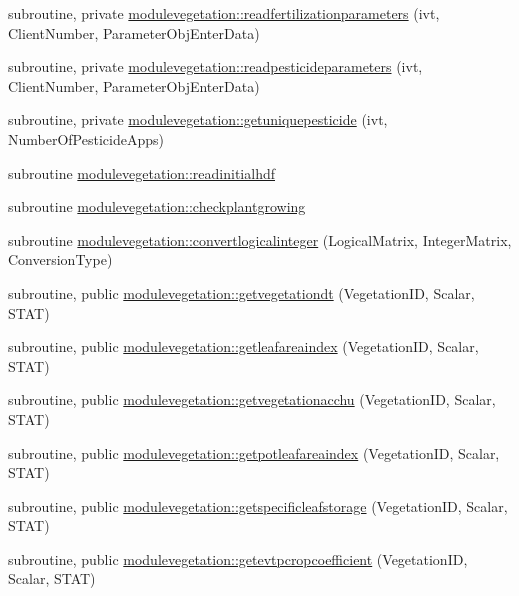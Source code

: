 \begin{DoxyCompactItemize}
subroutine, private \mbox{\hyperlink{namespacemodulevegetation_a5f1703a3712f12ee155098c63f043191}{modulevegetation\+::readfertilizationparameters}} (ivt, Client\+Number, Parameter\+Obj\+Enter\+Data)
\item 
subroutine, private \mbox{\hyperlink{namespacemodulevegetation_abfd09d09ab90a3303dcc3a496d57223a}{modulevegetation\+::readpesticideparameters}} (ivt, Client\+Number, Parameter\+Obj\+Enter\+Data)
\item 
subroutine, private \mbox{\hyperlink{namespacemodulevegetation_a57f3018a613928cdd40f99577993f439}{modulevegetation\+::getuniquepesticide}} (ivt, Number\+Of\+Pesticide\+Apps)
\item 
subroutine \mbox{\hyperlink{namespacemodulevegetation_ae02d565fa46c0234360e5a9da0983414}{modulevegetation\+::readinitialhdf}}
\item 
subroutine \mbox{\hyperlink{namespacemodulevegetation_a2d8935c5541507a64b862765b5c7702c}{modulevegetation\+::checkplantgrowing}}
\item 
subroutine \mbox{\hyperlink{namespacemodulevegetation_af795c019d50bbacd6767423599de5ea5}{modulevegetation\+::convertlogicalinteger}} (Logical\+Matrix, Integer\+Matrix, Conversion\+Type)
\item 
subroutine, public \mbox{\hyperlink{namespacemodulevegetation_a357b84bec55907c71de65f8c878020f2}{modulevegetation\+::getvegetationdt}} (Vegetation\+ID, Scalar, S\+T\+AT)
\item 
subroutine, public \mbox{\hyperlink{namespacemodulevegetation_acf7940a010ec79861c9eaee61e66b333}{modulevegetation\+::getleafareaindex}} (Vegetation\+ID, Scalar, S\+T\+AT)
\item 
subroutine, public \mbox{\hyperlink{namespacemodulevegetation_a9c5cba62246c38a0de1aebb1aaa788d6}{modulevegetation\+::getvegetationacchu}} (Vegetation\+ID, Scalar, S\+T\+AT)
\item 
subroutine, public \mbox{\hyperlink{namespacemodulevegetation_a135c6aa1fdf9824ab93f467c026a344f}{modulevegetation\+::getpotleafareaindex}} (Vegetation\+ID, Scalar, S\+T\+AT)
\item 
subroutine, public \mbox{\hyperlink{namespacemodulevegetation_aefe8dd6c224ba5b203b6c1be059d23e7}{modulevegetation\+::getspecificleafstorage}} (Vegetation\+ID, Scalar, S\+T\+AT)
\item 
subroutine, public \mbox{\hyperlink{namespacemodulevegetation_ac3fe071c0a204afbed0b3414ecb4e09d}{modulevegetation\+::getevtpcropcoefficient}} (Vegetation\+ID, Scalar, S\+T\+AT)
\item 

\end{DoxyCompactItemize}
